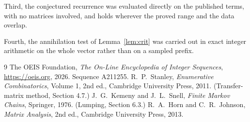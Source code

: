 \documentclass[11pt,a4paper]{article}
\theoremstyle{plain}
\theoremstyle{definition}
\begin{document}
Third, the conjectured recurrence was evaluated directly on the published terms, with no
matrices involved, and holds wherever the proved range and the data overlap.

Fourth, the annihilation test of Lemma~\ref{lem:crit} was carried out in exact integer
arithmetic on the whole vector rather than on a sampled prefix.

\begin{thebibliography}{9}
 The OEIS Foundation, \emph{The On-Line Encyclopedia of Integer
Sequences}, \url{https://oeis.org}, 2026. Sequence A211255.
 R.~P.~Stanley, \emph{Enumerative Combinatorics}, Volume 1, 2nd ed.,
Cambridge University Press, 2011. (Transfer-matrix method, Section 4.7.)
 J.~G.~Kemeny and J.~L.~Snell, \emph{Finite Markov Chains}, Springer, 1976.
(Lumping, Section 6.3.)
 R.~A.~Horn and C.~R.~Johnson, \emph{Matrix Analysis}, 2nd ed., Cambridge
University Press, 2013.
\end{thebibliography}
\end{document}
